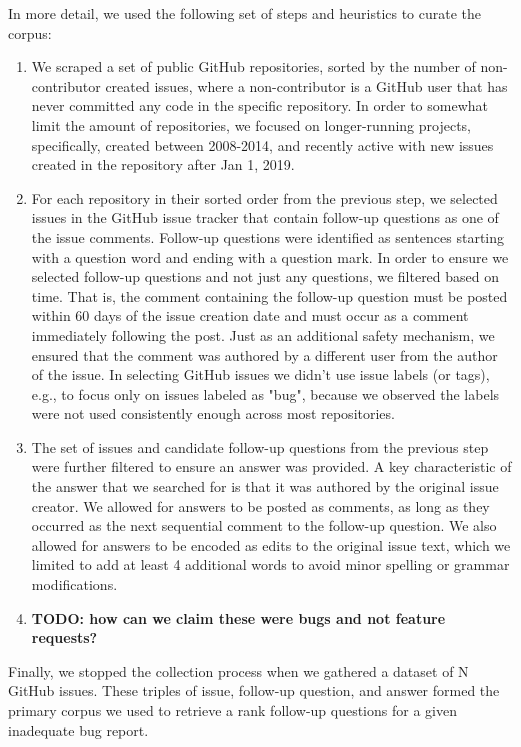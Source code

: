 In more detail, we used the following set of steps and heuristics to curate the corpus:
\begin{enumerate}
\item We scraped a set of public GitHub repositories, sorted by the number of
non-contributor created issues, where a non-contributor is a GitHub user that has never
committed any code in the specific repository. In order to somewhat limit the amount of repositories,
we focused on longer-running projects, specifically, created between 2008-2014, and recently
active with new issues created in the repository after Jan 1, 2019.
\item For each repository in their sorted order from the previous step, we selected issues in the GitHub issue tracker
that contain follow-up questions as one of the issue comments.  Follow-up questions were identified as sentences starting with a question word and ending with a question mark. In order to ensure we selected follow-up questions and not just
any questions, we filtered based on time. That is, the comment containing the follow-up question must be posted
within 60 days of the issue creation date and must occur as a comment immediately following the post. Just as an additional safety mechanism,
we ensured that the comment was authored by a different user from the author of the issue. In selecting GitHub issues
we didn't use issue labels (or tags), e.g., to focus only on issues labeled as "bug", because we observed the labels were not
used consistently enough across most repositories.
\item The set of issues and candidate follow-up questions from the previous step were further filtered to
ensure an answer was provided. A key characteristic of the answer that we searched for is that it was authored
by the original issue creator. We allowed for answers to be posted as comments, as long as they occurred as the next sequential comment
to the follow-up question. We also allowed for answers to be encoded as edits to the original issue text, which we limited to add at least 4 additional words to avoid minor spelling or grammar modifications.
\item {\bf TODO: how can we claim these were bugs and not feature requests?}
\end{enumerate}

Finally, we stopped the collection process when we gathered a dataset of N GitHub issues. These triples of
issue, follow-up question, and answer formed the primary corpus we used to retrieve a rank follow-up questions
for a given inadequate bug report.

